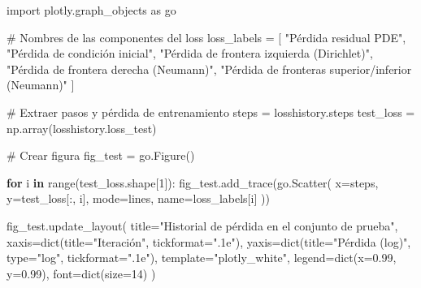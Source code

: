 \documentclass[
  spanish,
  us-letterpaper,
]{scrreprt}
\newenvironment{Shaded}{\begin{snugshade}}{\end{snugshade}}
\newcommand{\BuiltInTok}[1]{\textcolor[rgb]{0.00,0.23,0.31}{#1}}
\newcommand{\CommentTok}[1]{\textcolor[rgb]{0.37,0.37,0.37}{#1}}
\newcommand{\ControlFlowTok}[1]{\textcolor[rgb]{0.00,0.23,0.31}{\textbf{#1}}}
\newcommand{\DecValTok}[1]{\textcolor[rgb]{0.68,0.00,0.00}{#1}}
\newcommand{\FloatTok}[1]{\textcolor[rgb]{0.68,0.00,0.00}{#1}}
\newcommand{\ImportTok}[1]{\textcolor[rgb]{0.00,0.46,0.62}{#1}}
\newcommand{\KeywordTok}[1]{\textcolor[rgb]{0.00,0.23,0.31}{\textbf{#1}}}
\newcommand{\NormalTok}[1]{\textcolor[rgb]{0.00,0.23,0.31}{#1}}
\newcommand{\OperatorTok}[1]{\textcolor[rgb]{0.37,0.37,0.37}{#1}}
\newcommand{\StringTok}[1]{\textcolor[rgb]{0.13,0.47,0.30}{#1}}
\theoremstyle{definition}
\theoremstyle{plain}
\theoremstyle{remark}
\begin{document}
\begin{Shaded}
\begin{Highlighting}[]
\ImportTok{import}\NormalTok{ plotly.graph\_objects }\ImportTok{as}\NormalTok{ go}

\CommentTok{\# Nombres de las componentes del loss}
\NormalTok{loss\_labels }\OperatorTok{=}\NormalTok{ [}
    \StringTok{"Pérdida residual PDE"}\NormalTok{,}
    \StringTok{"Pérdida de condición inicial"}\NormalTok{,}
    \StringTok{"Pérdida de frontera izquierda (Dirichlet)"}\NormalTok{,}
    \StringTok{"Pérdida de frontera derecha (Neumann)"}\NormalTok{,}
    \StringTok{"Pérdida de fronteras superior/inferior (Neumann)"}
\NormalTok{]}

\CommentTok{\# Extraer pasos y pérdida de entrenamiento}
\NormalTok{steps }\OperatorTok{=}\NormalTok{ losshistory.steps}
\NormalTok{test\_loss }\OperatorTok{=}\NormalTok{ np.array(losshistory.loss\_test)}

\CommentTok{\# Crear figura}
\NormalTok{fig\_test }\OperatorTok{=}\NormalTok{ go.Figure()}

\ControlFlowTok{for}\NormalTok{ i }\KeywordTok{in} \BuiltInTok{range}\NormalTok{(test\_loss.shape[}\DecValTok{1}\NormalTok{]):}
\NormalTok{    fig\_test.add\_trace(go.Scatter(}
\NormalTok{        x}\OperatorTok{=}\NormalTok{steps,}
\NormalTok{        y}\OperatorTok{=}\NormalTok{test\_loss[:, i],}
\NormalTok{        mode}\OperatorTok{=}\StringTok{\textquotesingle{}lines\textquotesingle{}}\NormalTok{,}
\NormalTok{        name}\OperatorTok{=}\NormalTok{loss\_labels[i]}
\NormalTok{    ))}

\NormalTok{fig\_test.update\_layout(}
\NormalTok{    title}\OperatorTok{=}\StringTok{"Historial de pérdida en el conjunto de prueba"}\NormalTok{,}
\NormalTok{    xaxis}\OperatorTok{=}\BuiltInTok{dict}\NormalTok{(title}\OperatorTok{=}\StringTok{"Iteración"}\NormalTok{, tickformat}\OperatorTok{=}\StringTok{".1e"}\NormalTok{),}
\NormalTok{    yaxis}\OperatorTok{=}\BuiltInTok{dict}\NormalTok{(title}\OperatorTok{=}\StringTok{"Pérdida (log)"}\NormalTok{, }\BuiltInTok{type}\OperatorTok{=}\StringTok{"log"}\NormalTok{, tickformat}\OperatorTok{=}\StringTok{".1e"}\NormalTok{),}
\NormalTok{    template}\OperatorTok{=}\StringTok{"plotly\_white"}\NormalTok{,}
\NormalTok{    legend}\OperatorTok{=}\BuiltInTok{dict}\NormalTok{(x}\OperatorTok{=}\FloatTok{0.99}\NormalTok{, y}\OperatorTok{=}\FloatTok{0.99}\NormalTok{),}
\NormalTok{    font}\OperatorTok{=}\BuiltInTok{dict}\NormalTok{(size}\OperatorTok{=}\DecValTok{14}\NormalTok{)}
\NormalTok{)}
\end{Highlighting}
\end{Shaded}
\end{document}
